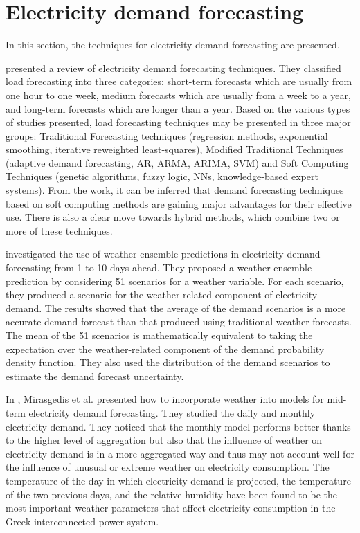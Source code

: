 \section{Electricity demand forecasting}
\label{sec:demandsoa}
\vspace{0.2 cm}

In this section, the techniques for electricity demand forecasting are presented.

\cite{singh2013overview} presented a review of electricity demand forecasting techniques.
They classified load forecasting into three categories:
short-term forecasts which are usually from one hour to one week,
medium forecasts which are usually from a week to a year,
and long-term forecasts which are longer than a year.
Based on the various types of studies presented, load forecasting techniques may be presented in three major groups: Traditional Forecasting techniques (regression methods, exponential smoothing, iterative reweighted least-squares), Modified Traditional Techniques (adaptive demand forecasting, AR, ARMA, ARIMA, SVM) and Soft Computing Techniques (genetic algorithms, fuzzy logic, NNs, knowledge-based expert systems).
From the work, it can be inferred that demand forecasting techniques based on soft computing methods are gaining major advantages for their effective use.
There is also a clear move towards hybrid methods, which combine two or more of these techniques.

\cite{TAYLOR200357} investigated the use of weather ensemble predictions in electricity demand forecasting from 1 to 10 days ahead.
They proposed a weather ensemble prediction by considering 51 scenarios for a weather variable.
For each scenario, they produced a scenario for the weather-related component of electricity demand.
The results showed that the average of the demand scenarios is a more accurate demand forecast than that produced using traditional weather forecasts.
The mean of the 51 scenarios is mathematically equivalent to taking the expectation over the weather-related component of the demand probability density function.
They also used the distribution of the demand scenarios to estimate the demand forecast uncertainty.

In \cite{MIRASGEDIS2006208}, Mirasgedis et al. presented how to incorporate weather into models for mid-term electricity demand forecasting.
They studied the daily and monthly electricity demand.
They noticed that the monthly model performs better thanks to the higher level of aggregation but also that the influence of weather on electricity demand is in a more aggregated way and thus may not account well for the influence of unusual or extreme weather on electricity consumption.
The temperature of the day in which electricity demand is projected, the temperature of the two previous days, and the relative humidity have been found to be the most important weather parameters that affect electricity consumption in the Greek interconnected power system.

